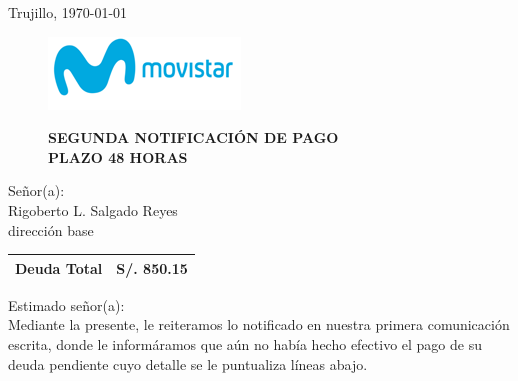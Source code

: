 %
%

\begin{flushright}
    Trujillo, \today
\end{flushright}
\vspace{-0.5cm}

\begin{figure}[h]
\begin{minipage}[b]{5.106458333cm}
\includegraphics[natwidth=5.106458333cm, natheight=1.931458333cm]{resources/business_logo.png}
\end{minipage}
\begin{minipage}[b][1.9314cm][t]{11cm}
\begin{flushright}
{\LARGE \bf SEGUNDA NOTIFICACIÓN DE PAGO\\PLAZO 48 HORAS}
\end{flushright}
\end{minipage}
\end{figure}

\noindent
Señor(a):\\
Rigoberto L. Salgado Reyes\\
dirección base

\begin{flushright}
\bf \large
\begin{tabular}{|p{3.2cm} p{3.2cm}|}
\hline
Deuda Total & S/. 850.15 \\
\hline
\end{tabular}
\end{flushright}

\noindent
Estimado señor(a):\\
Mediante la presente, le reiteramos lo notificado en nuestra primera comunicación escrita, donde le informáramos que aún no había hecho efectivo el pago de su deuda pendiente cuyo detalle se le puntualiza líneas abajo.

